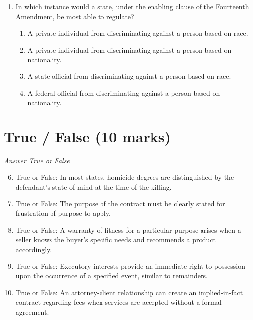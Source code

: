 \documentclass[12pt]{article}
\begin{document}
\begin{enumerate}[label=\arabic*.]
\begin{enumerate}[label=(\alph*)]
    \item It is an agreement between two or more to commit a crime.
    \item It is solicitation of another to commit a felony.
    \item No act is needed other than the solicitation.
    \item Withdrawal is generally not a defense.
\end{enumerate}
\item In which instance would a state, under the enabling clause of the Fourteenth Amendment, be most able to regulate?
\begin{enumerate}[label=(\alph*)]
    \item A private individual from discriminating against a person based on race.
    \item A private individual from discriminating against a person based on nationality.
    \item A state official from discriminating against a person based on race.
    \item A federal official from discriminating against a person based on nationality.
\end{enumerate}
\end{enumerate}

\section*{True / False (10 marks)}
\textit{Answer True or False}
\begin{enumerate}[label=\arabic*.]
\setcounter{enumi}{5}
\item True or False: In most states, homicide degrees are distinguished by the defendant's state of mind at the time of the killing.
\item True or False: The purpose of the contract must be clearly stated for frustration of purpose to apply.
\item True or False: A warranty of fitness for a particular purpose arises when a seller knows the buyer's specific needs and recommends a product accordingly.
\item True or False: Executory interests provide an immediate right to possession upon the occurrence of a specified event, similar to remainders.
\item True or False: An attorney-client relationship can create an implied-in-fact contract regarding fees when services are accepted without a formal agreement.
\end{enumerate}
\end{document}

